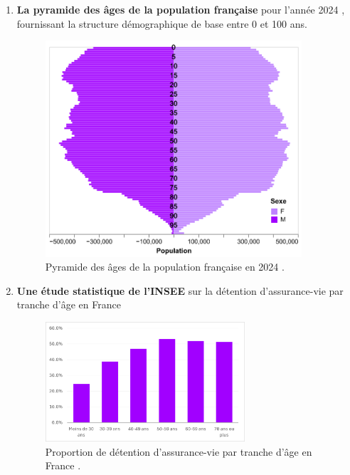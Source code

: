 \begin{enumerate}
\item \textbf{La pyramide des âges de la population française} pour l'année 2024 \cite{pyramide_age}, fournissant la structure démographique de base entre 0 et 100 ans.
\begin{figure}[H]
\centering
\includegraphics[width=0.9\textwidth]{images/2_chapitres/chapitre3/pyramide_age.png}
\caption{Pyramide des âges de la population française en 2024 \cite{pyramide_age}.}
\label{fig:pyramide_age}
\end{figure}
\item \textbf{Une étude statistique de l'INSEE} sur la détention d'assurance-vie par tranche d'âge en France \cite{insee_prop_av_age}
\begin{figure}[H]
\centering
\includegraphics[width=0.7\textwidth]{images/2_chapitres/chapitre3/insee_prop_av_age.png}
\caption{Proportion de détention d'assurance-vie par tranche d'âge en France \cite{insee_prop_av_age}.}
\label{fig:insee_prop_av_age}
\end{figure}
\end{enumerate}

